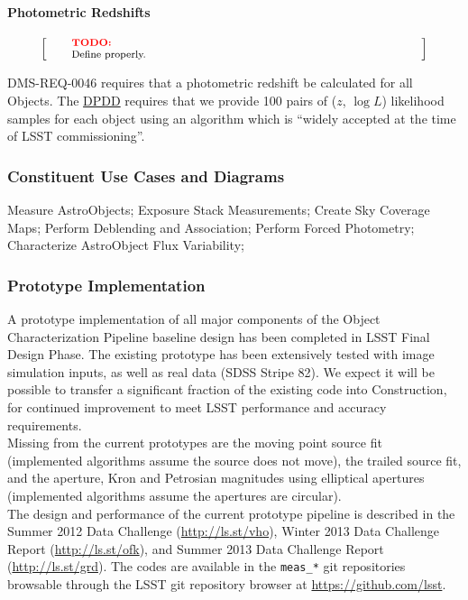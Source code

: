 \documentclass[12pt]{article}
\newcommand{\ds}[2]{{\color{blue} \href{https://docushare.lsstcorp.org/docushare/dsweb/Get/#1}{#2}}\xspace}
\newcommand{\DPDD}{\ds{LSE-163}{DPDD}}
\newenvironment{note}[1][Note]
{
  \begin{displaymath}
    \left[ \qquad
    \begin{minipage}[h]{.75\linewidth}
      \color{red} \footnotesize
      \textbf{#1:} \newline
      \color{black}
}
{
    \end{minipage}
    \normalsize
    \qquad \right]
  \end{displaymath}
}
\begin{document}
\paragraph{Photometric Redshifts}

\begin{note}[TODO]
Define properly.
\end{note}

DMS-REQ-0046 requires that a photometric redshift be calculated for all Objects. The \DPDD{} requires that we provide 100 pairs of ($z$, $\log L$) likelihood samples for each object using an algorithm which is ``widely accepted at the time of LSST commissioning''.

\subsubsection{Constituent Use Cases and Diagrams}

Measure AstroObjects; Exposure Stack Measurements;
Create Sky Coverage Maps; Perform Deblending and Association; Perform Forced Photometry; Characterize AstroObject Flux Variability;

\subsubsection{Prototype Implementation}

A prototype implementation of all major components of the Object Characterization Pipeline baseline design has been completed in LSST Final Design Phase. The existing prototype has been extensively tested with image simulation inputs, as well as real data (SDSS Stripe 82). We expect it will be possible to transfer a significant fraction of the existing code into Construction, for continued improvement to meet LSST performance and accuracy requirements.
\\

Missing from the current prototypes are the moving point source fit (implemented algorithms assume the source does not move), the trailed source fit, and the aperture, Kron and Petrosian magnitudes using elliptical apertures (implemented algorithms assume the apertures are circular).
\\

The design and performance of the current prototype pipeline is described in the Summer 2012 Data Challenge (\url{http://ls.st/vho}), Winter 2013 Data Challenge Report (\url{http://ls.st/ofk}), and Summer 2013 Data Challenge Report (\url{http://ls.st/grd}). The codes are available in the {\tt meas\_*} git repositories browsable through the LSST git repository browser at \url{https://github.com/lsst}.
\end{document}
